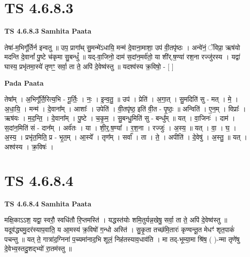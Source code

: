 \documentclass[17pt]{extarticle}
\begin{document}

\section{ TS 4.6.8.3 }

\textbf{TS 4.6.8.3 } \newline
\textbf{Samhita Paata} \newline

तेषा॑-म॒भिगू᳚र्तिर्न इन्वतु ॥ उप॒ प्रागा᳚थ् सु॒मन्मे॑ऽधायि॒ मन्म॑ दे॒वाना॒माशा॒ उप॑ वी॒तपृ॑ष्ठः । अन्वे॑नं॒ ॅविप्रा॒ ऋष॑यो मदन्ति दे॒वानां᳚ पु॒ष्टे च॑कृमा सु॒बन्धुं᳚ ॥ यद्-वा॒जिनो॒ दाम॑ स॒दांन॒मर्व॑तो॒ या शी॑र्.ष॒ण्या॑ रश॒ना रज्जु॑रस्य । यद्वा॑ घास्य॒ प्रभृ॑तमा॒स्ये॑ तृणꣳ॒॒ सर्वा॒ ता ते॒ अपि॑ दे॒वेष्व॑स्तु ॥ यदश्व॑स्य क्र॒विषो॒ - [  ] \newline

\textbf{Pada Paata} \newline

तेषा᳚म् । अ॒भिगू᳚र्ति॒रित्य॒भि - गू॒र्तिः॒ । नः॒ । इ॒न्व॒तु॒ ॥ उप॑ । प्रेति॑ । अ॒गा॒त् । सु॒मदिति॑ सु - मत् । मे॒ । अ॒धा॒यि॒ । मन्म॑ । दे॒वाना᳚म् । आशाः᳚ । उपेति॑ । वी॒तपृ॑ष्ठ॒ इति॑ वी॒त - पृ॒ष्ठः॒ ॥ अन्विति॑ । ए॒न॒म् । विप्राः᳚ । ऋष॑यः । म॒द॒न्ति॒ । दे॒वाना᳚म् । पु॒ष्टे । च॒कृ॒म॒ । सु॒बन्धु॒मिति॑ सु - बन्धु᳚म् ॥ यत् । वा॒जिनः॑ । दाम॑ । स॒दांन॒मिति॑ सं - दान᳚म् । अर्व॑तः । या । शी॒र्॒.ष॒ण्या᳚ । र॒श॒ना । रज्जुः॑ । अ॒स्य॒ ॥ यत् । वा॒ । घ॒ । अ॒स्य॒ । प्रभृ॑त॒मिति॒ प्र - भृ॒त॒म् । आ॒स्ये᳚ । तृण᳚म् । सर्वा᳚ । ता । ते॒ । अपीति॑ । दे॒वेषु॑ । अ॒स्तु॒ ॥ यत् । अश्व॑स्य । क्र॒विषः॑ ।  \newline





\section{ TS 4.6.8.4 }

\textbf{TS 4.6.8.4 } \newline
\textbf{Samhita Paata} \newline

मक्षि॒काऽऽश॒ यद्वा॒ स्वरौ॒ स्वधि॑तौ रि॒प्तमस्ति॑ । यद्धस्त॑योः शमि॒तुर्यन्न॒खेषु॒ सर्वा॒ ता ते॒ अपि॑ दे॒वेष्व॑स्तु ॥ यदूव॑द्ध्यमु॒दर॑स्याप॒वाति॒ य आ॒मस्य॑ क्र॒विषो॑ ग॒न्धो अस्ति॑ । सु॒कृ॒ता तच्छ॑मि॒तारः॑ कृण्वन्तू॒त मेधꣳ॑ शृत॒पाकं॑ पचन्तु ॥ यत् ते॒ गात्रा॑द॒ग्निना॑ प॒च्यमा॑नाद॒भि शूलं॒ निह॑तस्याव॒धाव॑ति । मा तद्-भूम्या॒मा श्रि॑ष॒ ( )-न्मा तृणे॑षु दे॒वेभ्य॒स्तदु॒शद्भ्यो॑ रा॒तम॑स्तु ॥ \newline
\end{document}
